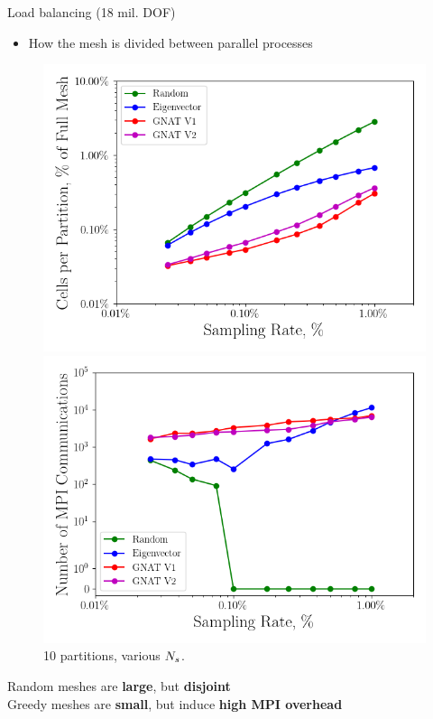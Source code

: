\documentclass[]{beamer}
\begin{document}
\begin{frame}{Load balancing (18 mil. DOF)}
	\begin{itemize}
		\item How the mesh is divided between parallel processes
	\end{itemize}
	\begin{figure}
		\begin{minipage}{0.49\linewidth}
			\includegraphics[width=0.99\linewidth]{Images/experiments/cvrc/cvrc_partition_stats.png}
		\end{minipage}
		\begin{minipage}{0.49\linewidth}
			\includegraphics[width=0.99\linewidth]{Images/experiments/cvrc/cvrc_partition_comms.png}
		\end{minipage}
		\caption*{10 partitions, various $N_s$.}
	\end{figure}
	\begin{tcolorbox}[colframe=blue!50!white,halign=center]
		Random meshes are \textbf{large}, but \textbf{disjoint} \\
		Greedy meshes are \textbf{small}, but induce \textbf{high MPI overhead}
	\end{tcolorbox}
\end{frame}
\end{document}
